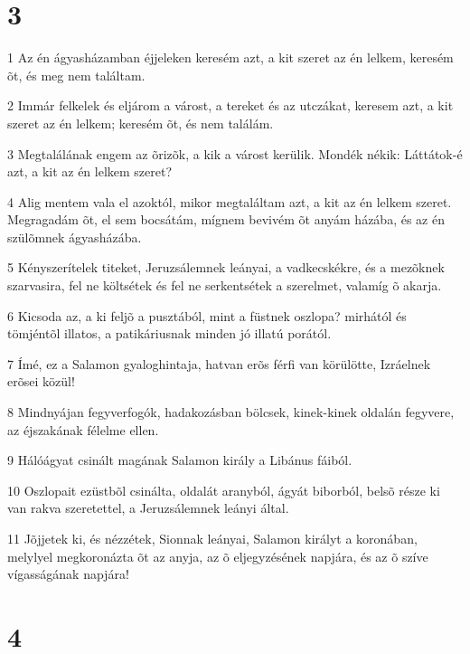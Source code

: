 \chapter{3}

\par 1 Az én ágyasházamban éjjeleken keresém azt, a kit szeret az én lelkem, keresém õt, és meg nem találtam.
\par 2 Immár felkelek és eljárom a várost, a tereket és az utczákat, keresem azt, a kit szeret az én lelkem; keresém õt, és nem találám.
\par 3 Megtalálának engem az õrizõk, a kik a várost kerülik. Mondék nékik: Láttátok-é azt, a kit az én lelkem szeret?
\par 4 Alig mentem vala el azoktól, mikor megtaláltam azt, a kit az én lelkem szeret. Megragadám õt, el sem bocsátám, mígnem bevivém õt anyám házába, és az én szülõmnek ágyasházába.
\par 5 Kényszerítelek titeket, Jeruzsálemnek leányai, a vadkecskékre, és a mezõknek szarvasira, fel ne költsétek és fel ne serkentsétek a szerelmet, valamíg õ akarja.
\par 6 Kicsoda az, a ki feljõ a pusztából, mint a füstnek oszlopa? mirhától és tömjéntõl illatos, a patikáriusnak minden jó illatú porától.
\par 7 Ímé, ez a Salamon gyaloghintaja, hatvan erõs férfi van körülötte, Izráelnek erõsei közül!
\par 8 Mindnyájan fegyverfogók, hadakozásban bölcsek, kinek-kinek oldalán fegyvere, az éjszakának félelme ellen.
\par 9 Hálóágyat csinált magának Salamon király a Libánus fáiból.
\par 10 Oszlopait ezüstbõl csinálta, oldalát aranyból, ágyát biborból, belsõ része ki van rakva szeretettel, a Jeruzsálemnek leányi által.
\par 11 Jõjjetek ki, és nézzétek, Sionnak leányai, Salamon királyt a koronában, melylyel megkoronázta õt az anyja, az õ eljegyzésének napjára, és az õ szíve vígasságának napjára!

\chapter{4}

